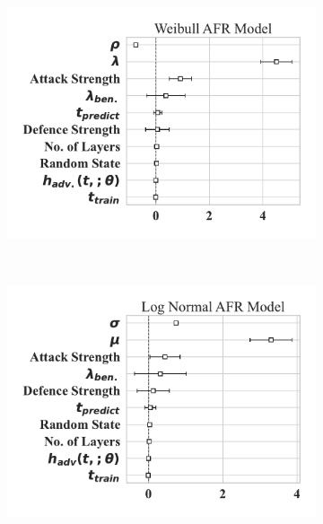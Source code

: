 \begin{figure}
    \begin{subfigure}{0.32\textwidth}
        \centering
        \includegraphics[width=\textwidth]{cifar/weibull_aft.pdf}
    \end{subfigure}%
    ~ 
    \begin{subfigure}{0.32\textwidth}
        \centering
        \includegraphics[width=\textwidth]{cifar/log_normal_aft.pdf}
    \end{subfigure}
    ~
    \begin{subfigure}{0.32\textwidth}
        \centering

\end{subfigure}
\end{figure}
